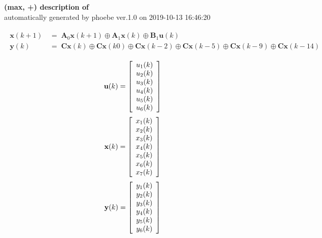 \documentclass[11pt, a4paper, fleqn]{article}
\begin{document}
\noindent
\textbf{(max, +) description of} \texttt{\currfilebase} \\
automatically generated by phoebe ver.1.0 on 2019-10-13 16:46:20 

\begin{align}\begin{split}
\mathbf{x}(k+1) & \, = \; \mathbf{A}_{0}\mathbf{x}(k+1) \oplus \mathbf{A}_{1}\mathbf{x}(k) \oplus \mathbf{B}_{1}\mathbf{u}(k)\\
\mathbf{y}(k) & \, = \; \mathbf{Cx}(k) \oplus \mathbf{Cx}(k0) \oplus \mathbf{Cx}(k-2) \oplus \mathbf{Cx}(k-5) \oplus \mathbf{Cx}(k-9) \oplus \mathbf{Cx}(k-14)
\end{split}\end{align}

\begin{equation*}
\mathbf{u}(k) = 
\left[\begin{array}{*{20}c}
  u_1(k) \\
  u_2(k) \\
  u_3(k) \\
  u_4(k) \\
  u_5(k) \\
  u_6(k) \\
\end{array}\right]
\end{equation*}
\begin{equation*}
\mathbf{x}(k) = 
\left[\begin{array}{*{20}c}
  x_1(k) \\
  x_2(k) \\
  x_3(k) \\
  x_4(k) \\
  x_5(k) \\
  x_6(k) \\
  x_7(k) \\
\end{array}\right]
\end{equation*}
\begin{equation*}
\mathbf{y}(k) = 
\left[\begin{array}{*{20}c}
  y_1(k) \\
  y_2(k) \\
  y_3(k) \\
  y_4(k) \\
  y_5(k) \\
  y_6(k) \\
\end{array}\right]
\end{equation*}
\noindent\\
\end{document}
